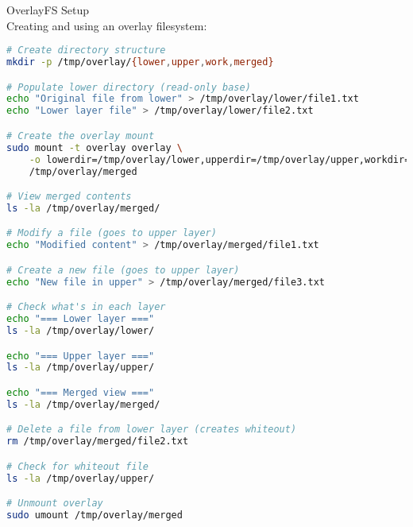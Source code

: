 \begin{example2}{OverlayFS Setup}\\
    Creating and using an overlay filesystem:
    
\begin{lstlisting}[language=bash, style=basesmol]
# Create directory structure
mkdir -p /tmp/overlay/{lower,upper,work,merged}

# Populate lower directory (read-only base)
echo "Original file from lower" > /tmp/overlay/lower/file1.txt
echo "Lower layer file" > /tmp/overlay/lower/file2.txt

# Create the overlay mount
sudo mount -t overlay overlay \
    -o lowerdir=/tmp/overlay/lower,upperdir=/tmp/overlay/upper,workdir=/tmp/overlay/work \
    /tmp/overlay/merged

# View merged contents
ls -la /tmp/overlay/merged/

# Modify a file (goes to upper layer)
echo "Modified content" > /tmp/overlay/merged/file1.txt

# Create a new file (goes to upper layer)
echo "New file in upper" > /tmp/overlay/merged/file3.txt

# Check what's in each layer
echo "=== Lower layer ==="
ls -la /tmp/overlay/lower/

echo "=== Upper layer ==="
ls -la /tmp/overlay/upper/

echo "=== Merged view ==="
ls -la /tmp/overlay/merged/

# Delete a file from lower layer (creates whiteout)
rm /tmp/overlay/merged/file2.txt

# Check for whiteout file
ls -la /tmp/overlay/upper/

# Unmount overlay
sudo umount /tmp/overlay/merged
\end{lstlisting}
\end{example2}

